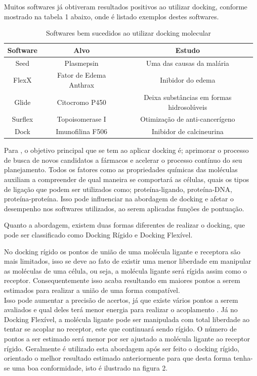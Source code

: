 \documentclass[tcc, capa]{texucpel}
\begin{document}
Muitos softwares já obtiveram resultados positivos ao utilizar docking, conforme mostrado na tabela 1 abaixo, onde é listado exemplos destes softwares.
\begin{table}[h]
\centering
\caption{Softwares bem sucedidos ao utilizar docking molecular \cite{sliwoski2014computational} }

\begin{tabular}{@{}|c|c|c|@{}}
\toprule

Software & Alvo                   & Estudo                                                   \\ \midrule
Seed     & Plasmepsin             & Uma das causas da malária                                \\ \midrule
FlexX    & Fator de Edema Anthrax & Inibidor do edema                                        \\ \midrule
Glide    & Citocromo P450         & Deixa substâncias em formas hidrosolúveis         \\ \midrule
Surflex  & Topoisomerase I        & Otimização de anti-cancerígeno                           \\ \midrule
Dock     & Imunofilina F506       & Inibidor de calcineurina \\ \bottomrule
\end{tabular}
\end{table}

Para \cite{rodrigues2012estrategias}, o objetivo principal que se tem ao aplicar docking é; aprimorar o processo de busca de novos candidatos a fármacos e acelerar o processo contínuo do seu planejamento. 
Todos os fatores como as propriedades químicas das moléculas auxiliam a compreender de qual maneira se comportará as células, quais os tipos de ligação que podem ser utilizados como; proteína-ligando, proteína-DNA, proteína-proteína. Isso pode influenciar na abordagem de docking e afetar o desempenho nos softwares utilizados, ao serem aplicadas funções de pontuação.

Quanto a abordagem, existem duas formas diferentes de realizar o docking, que pode ser classificado como Docking Rígido e Docking Flexível.

No docking rígido os pontos de união de uma molécula ligante e receptora são mais limitados, isso se deve ao fato de existir uma menor liberdade em manipular as moléculas de uma célula, ou seja, a molécula ligante será rígida assim como o receptor. Consequentemente isso acaba resultando em maiores pontos a serem estimados para realizar a união de uma forma compatível. \\
Isso pode aumentar a precisão de acertos, já que existe vários pontos a serem avaliados e qual deles terá menor energia para realizar o acoplamento \cite{pagadala2017software}. 
Já no Docking Flexível, a molécula ligante pode ser manipulada com total liberdade ao tentar se acoplar no receptor,  este que continuará sendo rígido. O número de pontos a ser estimado será menor por ser ajustado a molécula ligante ao receptor rígido.
Geralmente é utilizado esta abordagem após ser feito o docking rígido, orientado o melhor resultado estimado anteriormente para que desta forma tenha-se uma boa conformidade, isto é ilustrado na figura 2.
\end{document}
